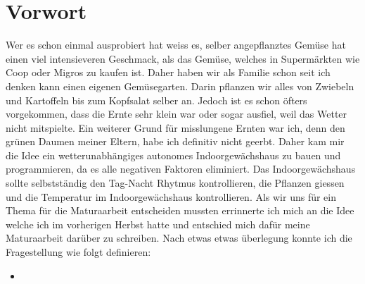 \section{Vorwort}
\label{sec:vorwort}

Wer es schon einmal ausprobiert hat weiss es, selber angepflanztes Gemüse hat einen viel intensieveren Geschmack, als das Gemüse, welches in Supermärkten wie Coop oder Migros zu kaufen ist. Daher haben wir als Familie schon seit ich denken kann einen eigenen Gemüsegarten. Darin pflanzen wir alles von Zwiebeln und Kartoffeln bis zum Kopfsalat selber an. Jedoch ist es schon öfters vorgekommen, dass die Ernte sehr klein war oder sogar ausfiel, weil das Wetter nicht mitspielte. Ein weiterer Grund für misslungene Ernten war ich, denn den grünen Daumen meiner Eltern, habe ich definitiv nicht geerbt.
Daher kam mir die Idee ein wetterunabhängiges autonomes Indoorgewächshaus zu bauen und programmieren, da es alle negativen Faktoren eliminiert. Das Indoorgewächshaus sollte selbstständig den Tag-Nacht Rhytmus kontrollieren, die Pflanzen giessen und die Temperatur im Indoorgewächshaus kontrollieren. \newline Als wir uns für ein Thema für die Maturaarbeit entscheiden mussten errinnerte ich mich an die Idee welche ich im vorherigen Herbst hatte und entschied mich dafür meine Maturaarbeit darüber zu schreiben. Nach etwas etwas überlegung konnte ich die Fragestellung wie folgt definieren:
\begin{itemize}
  \item \maFRAGE
\end{itemize}
